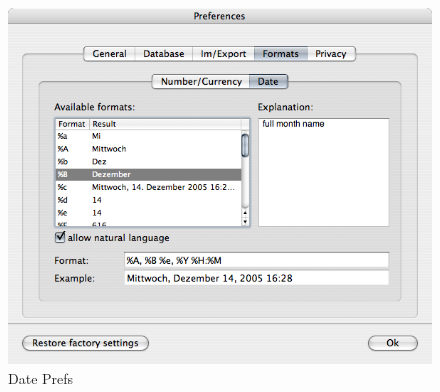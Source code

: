 \documentclass[12pt,a4]{article}
\begin{document}
\noindent
%
% 
\begin{figure}[ht]
\begin{center}
\includegraphics[width=13.5cm]{images/Prefs_DateFormat.png}
\end{center}
\caption{Date Prefs}
\label{image:dateprefs}
\end{figure}
\noindent
%
\end{document}
